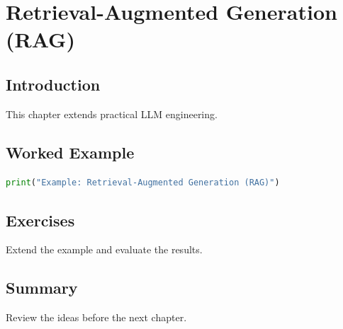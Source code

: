 \chapter{Retrieval-Augmented Generation (RAG)}
\label{chap:vol9-11}



\section{Introduction}
This chapter extends practical LLM engineering.

\section{Worked Example}
\begin{lstlisting}[language=Python]
print("Example: Retrieval-Augmented Generation (RAG)")
\end{lstlisting}

\section{Exercises}
\begin{exercise}
Extend the example and evaluate the results.
\end{exercise}

\section{Summary}
Review the ideas before the next chapter.
